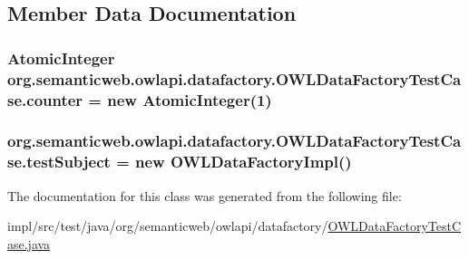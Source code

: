 \subsection{Member Data Documentation}
\hypertarget{classorg_1_1semanticweb_1_1owlapi_1_1datafactory_1_1_o_w_l_data_factory_test_case_a3f8c61412e7dfa0b0e5a5e79a84531d0}{
\subsubsection[{counter}]{\setlength{\rightskip}{0pt plus 5cm}Atomic\-Integer org.\-semanticweb.\-owlapi.\-datafactory.\-O\-W\-L\-Data\-Factory\-Test\-Case.\-counter = new Atomic\-Integer(1)\hspace{0.3cm}{\ttfamily [private]}}}\label{classorg_1_1semanticweb_1_1owlapi_1_1datafactory_1_1_o_w_l_data_factory_test_case_a3f8c61412e7dfa0b0e5a5e79a84531d0}
\hypertarget{classorg_1_1semanticweb_1_1owlapi_1_1datafactory_1_1_o_w_l_data_factory_test_case_ac5376984f3b758b3d71ae29317676a13}{
\subsubsection[{test\-Subject}]{ org.\-semanticweb.\-owlapi.\-datafactory.\-O\-W\-L\-Data\-Factory\-Test\-Case.\-test\-Subject = new {\bf O\-W\-L\-Data\-Factory\-Impl}()\hspace{0.3cm}{\ttfamily [private]}}}\label{classorg_1_1semanticweb_1_1owlapi_1_1datafactory_1_1_o_w_l_data_factory_test_case_ac5376984f3b758b3d71ae29317676a13}


The documentation for this class was generated from the following file\-:\begin{DoxyCompactItemize}
\item 
impl/src/test/java/org/semanticweb/owlapi/datafactory/\hyperlink{_o_w_l_data_factory_test_case_8java}{O\-W\-L\-Data\-Factory\-Test\-Case.\-java}\end{DoxyCompactItemize}
